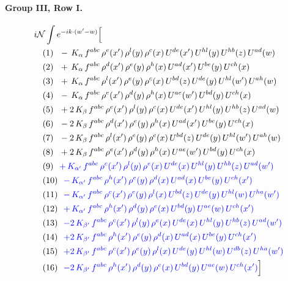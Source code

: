 \documentclass[10pt]{article}
\numberwithin{equation}{section}
\newcommand{\NN}{\mathcal N}
\begin{document}
\paragraph{Group III, Row I.}
\begin{align*}
&i\NN\int e^{-ik\cdot(w'-w)}\Big[\\
&\quad\text{(1)}\ \ -\,K_{\alpha}\,f^{abc}\,\rho^{e}(x')\,\rho^{l}(y)\,\rho^{c}(x)\,U^{de}(x')\,U^{hl}(y)\,U^{hb}(z)\,U^{ad}(w)\\
&\quad\text{(2)}\ \ +\,K_{\alpha}\,f^{abc}\,\rho^{d}(x')\,\rho^{e}(y)\,\rho^{h}(x)\,U^{ad}(x')\,U^{be}(y)\,U^{ch}(x)\\
&\quad\text{(3)}\ \ +\,K_{\alpha}\,f^{abc}\,\rho^{l}(x')\,\rho^{e}(y)\,\rho^{c}(x)\,U^{bd}(z)\,U^{de}(y)\,U^{hl}(w')\,U^{ah}(w)\\
&\quad\text{(4)}\ \ -\,K_{\alpha}\,f^{abc}\,\rho^{e}(x')\,\rho^{d}(y)\,\rho^{h}(x)\,U^{ae}(w')\,U^{bd}(y)\,U^{ch}(x)\\
&\quad\text{(5)}\ \ +2\,K_{\beta}\,f^{abc}\,\rho^{e}(x')\,\rho^{l}(y)\,\rho^{c}(x)\,U^{de}(x')\,U^{hl}(y)\,U^{hb}(z)\,U^{ad}(w)\\
&\quad\text{(6)}\ \ -2\,K_{\beta}\,f^{abc}\,\rho^{d}(x')\,\rho^{e}(y)\,\rho^{h}(x)\,U^{ad}(x')\,U^{be}(y)\,U^{ch}(x)\\
&\quad\text{(7)}\ \ -2\,K_{\beta}\,f^{abc}\,\rho^{l}(x')\,\rho^{e}(y)\,\rho^{c}(x)\,U^{bd}(z)\,U^{de}(y)\,U^{hl}(w')\,U^{ah}(w)\\
&\quad\text{(8)}\ \ +2\,K_{\beta}\,f^{abc}\,\rho^{e}(x')\,\rho^{d}(y)\,\rho^{h}(x)\,U^{ae}(w')\,U^{bd}(y)\,U^{ch}(x)\\
&\quad\text{(9)}\ \ \textcolor{blue}{+\,K_{\alpha'}\,f^{abc}\,\rho^{c}(x')\,\rho^{l}(y)\,\rho^{e}(x)\,U^{de}(x)\,U^{hl}(y)\,U^{hb}(z)\,U^{ad}(w')}\\
&\quad\text{(10)}\ \ \textcolor{blue}{-\,K_{\alpha'}\,f^{abc}\,\rho^{h}(x')\,\rho^{e}(y)\,\rho^{d}(x)\,U^{ad}(x)\,U^{be}(y)\,U^{ch}(x')}\\
&\quad\text{(11)}\ \ \textcolor{blue}{-\,K_{\alpha'}\,f^{abc}\,\rho^{c}(x')\,\rho^{e}(y)\,\rho^{l}(x)\,U^{bd}(z)\,U^{de}(y)\,U^{hl}(w)\,U^{ha}(w')}\\
&\quad\text{(12)}\ \ \textcolor{blue}{+\,K_{\alpha'}\,f^{abc}\,\rho^{h}(x')\,\rho^{d}(y)\,\rho^{e}(x)\,U^{bd}(y)\,U^{ae}(w)\,U^{ch}(x')}\\
&\quad\text{(13)}\ \ \textcolor{blue}{-2\,K_{\beta'}\,f^{abc}\,\rho^{c}(x')\,\rho^{l}(y)\,\rho^{e}(x)\,U^{de}(x)\,U^{hl}(y)\,U^{hb}(z)\,U^{ad}(w')}\\
&\quad\text{(14)}\ \ \textcolor{blue}{+2\,K_{\beta'}\,f^{abc}\,\rho^{h}(x')\,\rho^{e}(y)\,\rho^{d}(x)\,U^{ad}(x)\,U^{be}(y)\,U^{ch}(x')}\\
&\quad\text{(15)}\ \ \textcolor{blue}{+2\,K_{\beta'}\,f^{abc}\,\rho^{c}(x')\,\rho^{e}(y)\,\rho^{l}(x)\,U^{de}(y)\,U^{hl}(w)\,U^{db}(z)\,U^{ha}(w')}\\
&\quad\text{(16)}\ \ \textcolor{blue}{-2\,K_{\beta'}\,f^{abc}\,\rho^{h}(x')\,\rho^{d}(y)\,\rho^{e}(x)\,U^{bd}(y)\,U^{ae}(w)\,U^{ch}(x')}\Big]
\end{align*}
\end{document}
